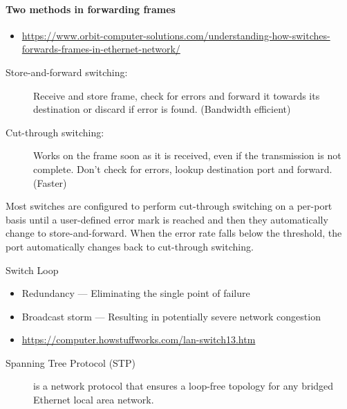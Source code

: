 \paragraph{Two methods in forwarding frames}
\begin{itemize}
\item \url{https://www.orbit-computer-solutions.com/understanding-how-switches-forwards-frames-in-ethernet-network/}
\end{itemize}
\begin{description}
\item[Store-and-forward switching:] Receive and store frame, check for errors and forward
  it towards its destination or discard if error is found. (Bandwidth efficient)
\item[Cut-through switching:] Works on the frame soon as it is received, even if the
  transmission is not complete. Don't check for errors, lookup destination port and
  forward. (Faster)
\end{description}
Most switches are configured to perform cut-through switching on a per-port basis until a
user-defined error mark is reached and then they automatically change to
store-and-forward. When the error rate falls below the threshold, the port automatically
changes back to cut-through switching.

\begin{frame}{Switch Loop}
  \begin{itemize}
  \item[{\Large \good}] Redundancy --- Eliminating the single point of failure
  \item[{\Large \textcolor{red}{\bad}}] Broadcast storm --- Resulting in potentially severe network congestion
  \end{itemize}
  \centering
\end{frame}

\begin{itemize}
\item \url{https://computer.howstuffworks.com/lan-switch13.htm}
\end{itemize}

\begin{frame}
  \begin{description}
  \item[Spanning Tree Protocol (STP)] is a network protocol that ensures a loop-free
    topology for any bridged Ethernet local area network.
  \end{description}
  \begin{center}
  \end{center}
\end{frame}

